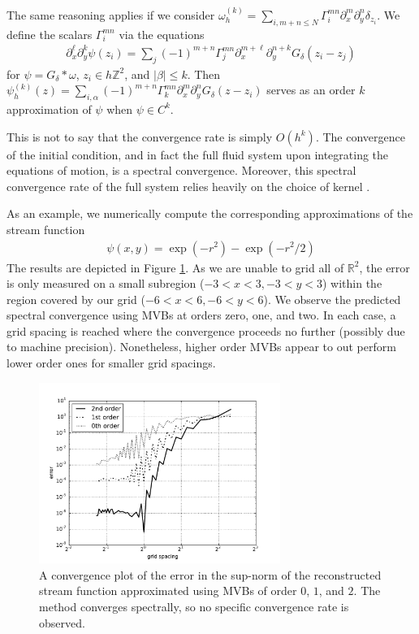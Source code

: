 \documentclass[12pt]{amsart}
\theoremstyle{remark}
\begin{document}
The same reasoning applies if we consider $\omega^{(k)}_h = \sum_{i,m+n \leq N} \Gamma_i^{mn} \partial_x^m \partial_y^n \delta_{z_i}$.
We define the scalars $\Gamma_i^{mn}$ via the equations
\begin{align*}
  \partial_x^\ell \partial_y^k \psi (z_i) = \sum_j (-1)^{m+n} \Gamma_j^{mn} \partial_x^{m+\ell} \partial_y^{n+k} G_\delta(z_i - z_j)
\end{align*}
for $\psi = G_\delta*\omega$, $z_i \in h \mathbb{Z}^2$, and $|\beta| \leq k$.
Then $\psi^{(k)}_h (z)= \sum_{i,\alpha} (-1)^{m+n} \Gamma_k^{mn} \partial_x^m \partial_y^n G_\delta( z - z_i)$
serves as an order $k$ approximation of $\psi$ when $\psi \in C^k$.

This is not to say that the convergence rate is simply $O(h^k)$.
The convergence of the initial condition, and in fact the full fluid system
upon integrating the equations of motion, is a spectral convergence.
Moreover, this spectral convergence rate of the full system relies heavily on the choice of kernel
\cite{BealeMajda1982}.

As an example, we numerically compute the corresponding approximations of the stream function
\begin{align}
        \psi(x,y) = \exp( - r^2 ) - \exp( - r^2 / 2 )
        \label{eq:psi_exact}
\end{align}
The results are depicted in Figure \ref{fig:convergence}.
As we are unable to grid all of $\mathbb{R}^2$, the error
is only measured on a small subregion ($-3<x<3, -3<y<3$) within the region covered by our grid
($-6<x<6, -6 < y < 6 $).
We observe the predicted spectral convergence using MVBs at orders zero, one, and two.
In each case, a grid spacing is reached where the convergence proceeds no further (possibly 
due to machine precision).
Nonetheless, higher order MVBs appear to out perform lower order ones for smaller grid spacings.
\begin{figure}[h]
        \centering
        \includegraphics[width=0.7\textwidth]{./images/convergence.pdf}
        \caption{A convergence plot of the error in the sup-norm
        of the reconstructed stream function approximated using MVBs of order $0$, $1$, and $2$.
        The method converges spectrally, so no specific convergence rate is observed.}
        \label{fig:convergence}
\end{figure}
\end{document}
